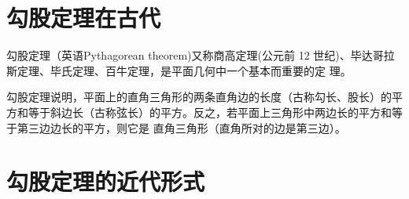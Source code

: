 \documentclass[UTF8]{ctexart}
\author{张三}
\date{\today}
\begin{document}
  \maketitle %
  \tableofcontents %
  \section{勾股定理在古代}
    勾股定理（英语Pythagorean theorem)又称商高定理(公元前 12 世纪)、毕达哥拉斯定理、毕氏定理、百牛定理，是平面几何中一个基本而重要的定 理。%

    勾股定理说明，平面上的直角三角形的两条直角边的长度（古称勾长、股长）的平方和等于斜边长（古称弦长）的平方。反之，若平面上三角形中两边长的平方和等于第三边边长的平方，则它是
    直角三角形（直角所对的边是第三边）。
  \section{勾股定理的近代形式}
\end{document}
